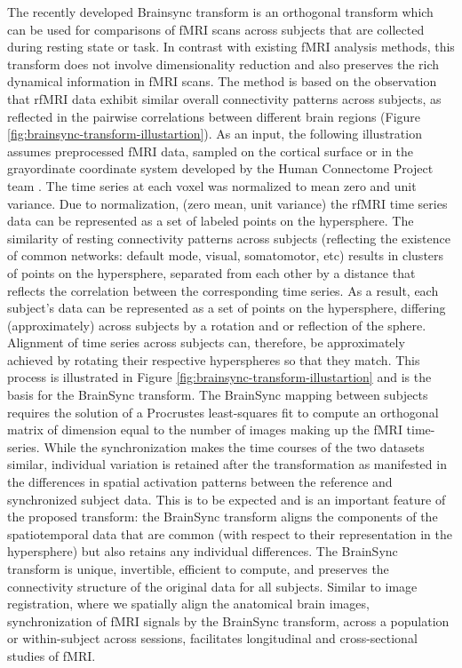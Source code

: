 \documentclass[preprint,12pt]{elsarticle}
\begin{document}
The recently developed Brainsync transform is an orthogonal transform
\cite{descoteaux_brainsync:_2017,joshi_are_2018} which can be used
for comparisons of fMRI scans across subjects that are collected during
resting state or task. In contrast with existing fMRI analysis methods,
this transform does not involve dimensionality reduction and also
preserves the rich dynamical information in fMRI scans. The method
is based on the observation that rfMRI data exhibit similar overall
connectivity patterns across subjects, as reflected in the pairwise
correlations between different brain regions (Figure \ref{fig:brainsync-transform-illustartion}).
As an input, the following illustration assumes preprocessed fMRI
data, sampled on the cortical surface or in the grayordinate coordinate
system developed by the Human Connectome Project team \cite{glasser_minimal_2013}.
The time series at each voxel was normalized to mean zero and unit
variance. Due to normalization, (zero mean, unit variance) the rfMRI
time series data can be represented as a set of labeled points on
the hypersphere. The similarity of resting connectivity patterns across
subjects (reflecting the existence of common networks: default mode,
visual, somatomotor, etc) results in clusters of points on the hypersphere,
separated from each other by a distance that reflects the correlation
between the corresponding time series. As a result, each subject's
data can be represented as a set of points on the hypersphere, differing
(approximately) across subjects by a rotation and or reflection of
the sphere. Alignment of time series across subjects can, therefore,
be approximately achieved by rotating their respective hyperspheres
so that they match. This process is illustrated in Figure \ref{fig:brainsync-transform-illustartion}
and is the basis for the BrainSync transform. The BrainSync mapping
between subjects requires the solution of a Procrustes least-squares
fit \cite{gower_procrustes_2004,ten_berge_orthogonal_1977} to compute
an orthogonal matrix of dimension equal to the number of images making
up the fMRI time-series. While the synchronization makes the time
courses of the two datasets similar, individual variation is retained
after the transformation as manifested in the differences in spatial
activation patterns between the reference and synchronized subject
data. This is to be expected and is an important feature of the proposed
transform: the BrainSync transform aligns the components of the spatiotemporal
data that are common (with respect to their representation in the
hypersphere) but also retains any individual differences. The BrainSync
transform is unique, invertible, efficient to compute, and preserves
the connectivity structure of the original data for all subjects.
Similar to image registration, where we spatially align the anatomical
brain images, synchronization of fMRI signals by the BrainSync transform,
across a population or within-subject across sessions, facilitates
longitudinal and cross-sectional studies of fMRI.
\end{document}
